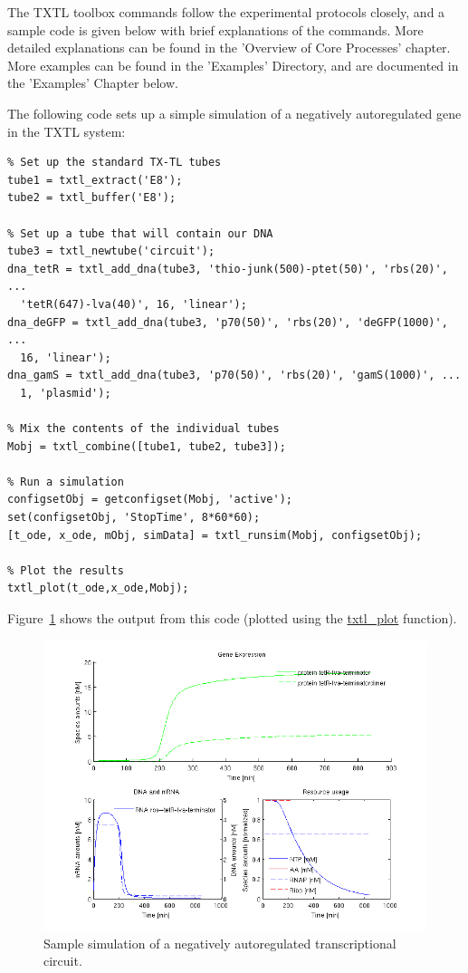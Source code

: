 The TXTL toolbox commands follow the experimental protocols closely,
and a sample code is given below with brief explanations
of the commands. More detailed explanations can be found in the
'Overview of Core Processes' chapter. More examples can be found in
the 'Examples' Directory, and are documented in the 'Examples' Chapter
below.

The following code sets up a simple simulation of a negatively
autoregulated gene in the TXTL system:
\begin{verbatim}
% Set up the standard TX-TL tubes
tube1 = txtl_extract('E8');
tube2 = txtl_buffer('E8');

% Set up a tube that will contain our DNA
tube3 = txtl_newtube('circuit');
dna_tetR = txtl_add_dna(tube3, 'thio-junk(500)-ptet(50)', 'rbs(20)', ...
  'tetR(647)-lva(40)', 16, 'linear');
dna_deGFP = txtl_add_dna(tube3, 'p70(50)', 'rbs(20)', 'deGFP(1000)', ...
  16, 'linear');
dna_gamS = txtl_add_dna(tube3, 'p70(50)', 'rbs(20)', 'gamS(1000)', ...
  1, 'plasmid');

% Mix the contents of the individual tubes 
Mobj = txtl_combine([tube1, tube2, tube3]);

% Run a simulation
configsetObj = getconfigset(Mobj, 'active');
set(configsetObj, 'StopTime', 8*60*60);
[t_ode, x_ode, mObj, simData] = txtl_runsim(Mobj, configsetObj);

% Plot the results
txtl_plot(t_ode,x_ode,Mobj);
\end{verbatim}
Figure~\ref{fig:intro:negautoreg} shows the output from this code (plotted
using the \url{txtl_plot} function).
\begin{figure}
  \centering
  \includegraphics[width=\textwidth]{negauto_1nM_toolbox}
  \caption{Sample simulation of a negatively autoregulated
  transcriptional circuit.}
  \label{fig:intro:negautoreg}
\end{figure}
